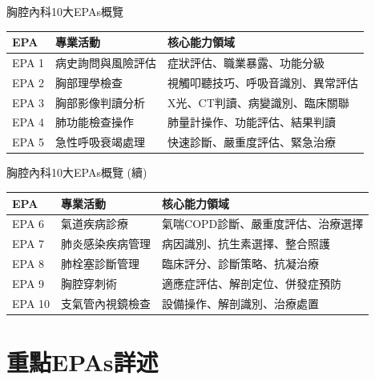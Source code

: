 \documentclass[aspectratio=169]{beamer}
\begin{document}
\begin{frame}{胸腔內科10大EPAs概覽}
\footnotesize
\begin{table}
\centering
\begin{tabular}{|p{1cm}|p{4cm}|p{6cm}|}
\hline
\rowcolor{emergency_blue!20}
\textbf{EPA} & \textbf{專業活動} & \textbf{核心能力領域} \\
\hline
EPA 1 & 病史詢問與風險評估 & 症狀評估、職業暴露、功能分級 \\
\hline
EPA 2 & 胸部理學檢查 & 視觸叩聽技巧、呼吸音識別、異常評估 \\
\hline
EPA 3 & 胸部影像判讀分析 & X光、CT判讀、病變識別、臨床關聯 \\
\hline
EPA 4 & 肺功能檢查操作 & 肺量計操作、功能評估、結果判讀 \\
\hline
EPA 5 & 急性呼吸衰竭處理 & 快速診斷、嚴重度評估、緊急治療 \\
\hline
\end{tabular}
\end{table}
\end{frame}

\begin{frame}{胸腔內科10大EPAs概覽 (續)}
\footnotesize
\begin{table}
\centering
\begin{tabular}{|p{1cm}|p{4cm}|p{6cm}|}
\hline
\rowcolor{emergency_blue!20}
\textbf{EPA} & \textbf{專業活動} & \textbf{核心能力領域} \\
\hline
EPA 6 & 氣道疾病診療 & 氣喘COPD診斷、嚴重度評估、治療選擇 \\
\hline
EPA 7 & 肺炎感染疾病管理 & 病因識別、抗生素選擇、整合照護 \\
\hline
EPA 8 & 肺栓塞診斷管理 & 臨床評分、診斷策略、抗凝治療 \\
\hline
EPA 9 & 胸腔穿刺術 & 適應症評估、解剖定位、併發症預防 \\
\hline
EPA 10 & 支氣管內視鏡檢查 & 設備操作、解剖識別、治療處置 \\
\hline
\end{tabular}
\end{table}
\end{frame}

\section{重點EPAs詳述}
\end{document}
